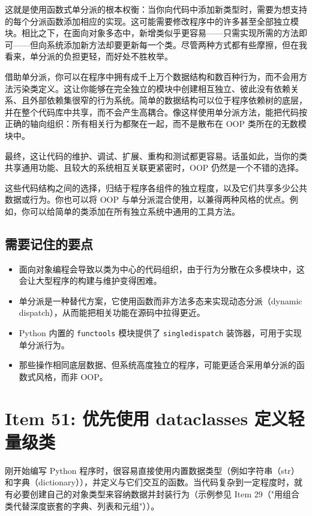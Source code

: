 这就是使用函数式单分派的根本权衡：当你向代码中添加新类型时，需要为想支持的每个分派函数添加相应的实现。这可能需要修改程序中的许多甚至全部独立模块。相比之下，在面向对象多态中，新增类似乎更容易——只需实现所需的方法即可——但向系统添加新方法却要更新每一个类。尽管两种方式都有些摩擦，但在我看来，单分派的负担更轻，而好处不胜枚举。

借助单分派，你可以在程序中拥有成千上万个数据结构和数百种行为，而不会用方法污染类定义。这让你能够在完全独立的模块中创建相互独立、彼此没有依赖关系、且外部依赖集很窄的行为系统。简单的数据结构可以位于程序依赖树的底层，并在整个代码库中共享，而不会产生高耦合。像这样使用单分派方法，能把代码按正确的轴向组织：所有相关行为都聚在一起，而不是散布在 OOP 类所在的无数模块中。

最终，这让代码的维护、调试、扩展、重构和测试都更容易。话虽如此，当你的类共享通用功能、且较大的系统相互关联更紧密时，OOP 仍然是一个不错的选择。

这些代码结构之间的选择，归结于程序各组件的独立程度，以及它们共享多少公共数据或行为。你也可以将 OOP 与单分派混合使用，以兼得两种风格的优点。例如，你可以给简单的类添加在所有独立系统中通用的工具方法。

\subsection{需要记住的要点}

\begin{itemize}
\item 面向对象编程会导致以类为中心的代码组织，由于行为分散在众多模块中，这会让大型程序的构建与维护变得困难。
\item 单分派是一种替代方案，它使用函数而非方法多态来实现动态分派（dynamic dispatch），从而能把相关功能在源码中拉得更近。
\item Python 内置的 \texttt{functools} 模块提供了 \texttt{singledispatch} 装饰器，可用于实现单分派行为。
\item 那些操作相同底层数据、但系统高度独立的程序，可能更适合采用单分派的函数式风格，而非 OOP。
\end{itemize}

\section{Item 51: 优先使用 dataclasses 定义轻量级类}

刚开始编写 Python 程序时，很容易直接使用内置数据类型（例如字符串（str）和字典（dictionary）），并定义与它们交互的函数。当代码复杂到一定程度时，就有必要创建自己的对象类型来容纳数据并封装行为（示例参见 Item 29（"用组合类代替深度嵌套的字典、列表和元组"））。

